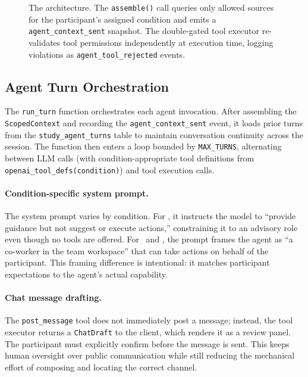 \begin{figure}[h]
  \centering
  \fbox{\rule{0pt}{5cm}\rule{0.85\linewidth}{0pt}}
  \caption{The \ContextGate architecture. The \texttt{assemble()} call queries only
    allowed sources for the participant's assigned condition and emits a
    \texttt{agent\_context\_sent} snapshot. The double-gated tool executor
    re-validates tool permissions independently at execution time, logging
    violations as \texttt{agent\_tool\_rejected} events.}
  \label{fig:gate}
\end{figure}

\subsection{Agent Turn Orchestration}
\label{sec:system:agent}

The \texttt{run\_turn} function orchestrates each agent invocation. After
assembling the \texttt{ScopedContext} and recording the
\texttt{agent\_context\_sent} event, it loads prior turns from the
\texttt{study\_agent\_turns} table to maintain conversation continuity across
the session. The function then enters a loop bounded by \texttt{MAX\_TURNS},
alternating between LLM calls (with condition-appropriate tool definitions from
\texttt{openai\_tool\_defs(condition)}) and tool execution calls.

\paragraph{Condition-specific system prompt.}
The system prompt varies by condition. For \CI, it instructs the model to
``provide guidance but not suggest or execute actions,'' constraining it to an
advisory role even though no tools are offered. For \CII\ and \CIII, the prompt
frames the agent as ``a co-worker in the team workspace'' that can take actions
on behalf of the participant. This framing difference is intentional: it matches
participant expectations to the agent's actual capability.

\paragraph{Chat message drafting.}
The \texttt{post\_message} tool does not immediately post a message; instead,
the tool executor returns a \texttt{ChatDraft} to the client, which renders it
as a review panel. The participant must explicitly confirm before the message is
sent. This keeps human oversight over public communication while still reducing
the mechanical effort of composing and locating the correct channel.

